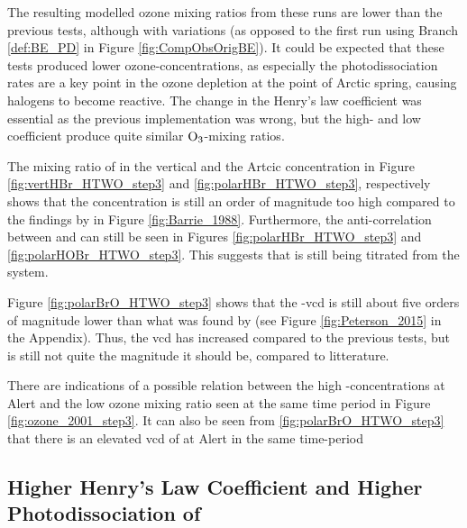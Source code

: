 The resulting modelled ozone mixing ratios from these runs are lower than the previous tests, although with variations (as opposed to the first run using Branch \ref{def:BE_PD} in Figure \ref{fig:CompObsOrigBE}). It could be expected that these tests produced lower ozone-concentrations, as especially the photodissociation rates are a key point in the ozone depletion at the point of Arctic spring, causing halogens to become reactive. The change in the Henry's law coefficient was essential as the previous implementation was wrong, but the high- and low coefficient produce quite similar $\mathrm{O_3}$-mixing ratios. 

\medskip

The mixing ratio of  in the vertical and the Artcic concentration in Figure \ref{fig:vertHBr_HTWO_step3} and \ref{fig:polarHBr_HTWO_step3}, respectively shows that the  concentration is still an order of magnitude too high compared to the findings by \cite{barrie} in Figure \ref{fig:Barrie_1988}. Furthermore, the anti-correlation between  and  can still be seen in Figures \ref{fig:polarHBr_HTWO_step3} and \ref{fig:polarHOBr_HTWO_step3}. This suggests that  is still being titrated from the system. 

\medskip

Figure \ref{fig:polarBrO_HTWO_step3} shows that the -\acrshort{vcd} is still about five orders of magnitude lower than what was found by \cite{Peterson2015} (see Figure \ref{fig:Peterson_2015} in the Appendix). Thus, the \acrshort{vcd} has increased compared to the previous tests, but is still not quite the magnitude it should be, compared to litterature. 

\medskip

There are indications of a possible relation between the high -concentrations at Alert and the low ozone mixing ratio seen at the same time period in Figure \ref{fig:ozone_2001_step3}. It can also be seen from \ref{fig:polarBrO_HTWO_step3} that there is an elevated \acrshort{vcd} of  at Alert in the same  time-period

\subsection{Higher Henry's Law Coefficient and Higher Photodissociation of }\label{sec:disc_step4}


